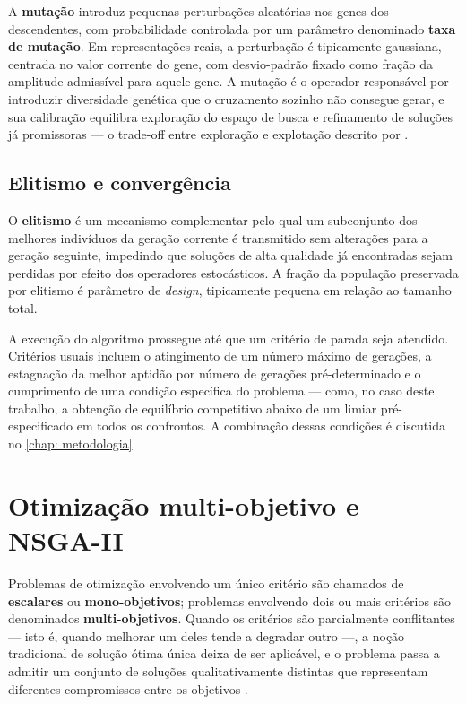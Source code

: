 A \textbf{mutação} introduz pequenas perturbações aleatórias nos genes dos descendentes, com probabilidade controlada por um parâmetro denominado \textbf{taxa de mutação}. Em representações reais, a perturbação é tipicamente gaussiana, centrada no valor corrente do gene, com desvio-padrão fixado como fração da amplitude admissível para aquele gene. A mutação é o operador responsável por introduzir diversidade genética que o cruzamento sozinho não consegue gerar, e sua calibração equilibra exploração do espaço de busca e refinamento de soluções já promissoras --- o trade-off entre exploração e explotação descrito por .

\subsection{Elitismo e convergência}

O \textbf{elitismo} é um mecanismo complementar pelo qual um subconjunto dos melhores indivíduos da geração corrente é transmitido sem alterações para a geração seguinte, impedindo que soluções de alta qualidade já encontradas sejam perdidas por efeito dos operadores estocásticos. A fração da população preservada por elitismo é parâmetro de \textit{design}, tipicamente pequena em relação ao tamanho total.

A execução do algoritmo prossegue até que um critério de parada seja atendido. Critérios usuais incluem o atingimento de um número máximo de gerações, a estagnação da melhor aptidão por número de gerações pré-determinado e o cumprimento de uma condição específica do problema --- como, no caso deste trabalho, a obtenção de equilíbrio competitivo abaixo de um limiar pré-especificado em todos os confrontos. A combinação dessas condições é discutida no \autoref{chap: metodologia}.

\section{Otimização multi-objetivo e NSGA-II}
\label{sec: nsga2}

Problemas de otimização envolvendo um único critério são chamados de \textbf{escalares} ou \textbf{mono-objetivos}; problemas envolvendo dois ou mais critérios são denominados \textbf{multi-objetivos}. Quando os critérios são parcialmente conflitantes --- isto é, quando melhorar um deles tende a degradar outro ---, a noção tradicional de solução ótima única deixa de ser aplicável, e o problema passa a admitir um conjunto de soluções qualitativamente distintas que representam diferentes compromissos entre os objetivos \cite{deb2001multiobjective}.

